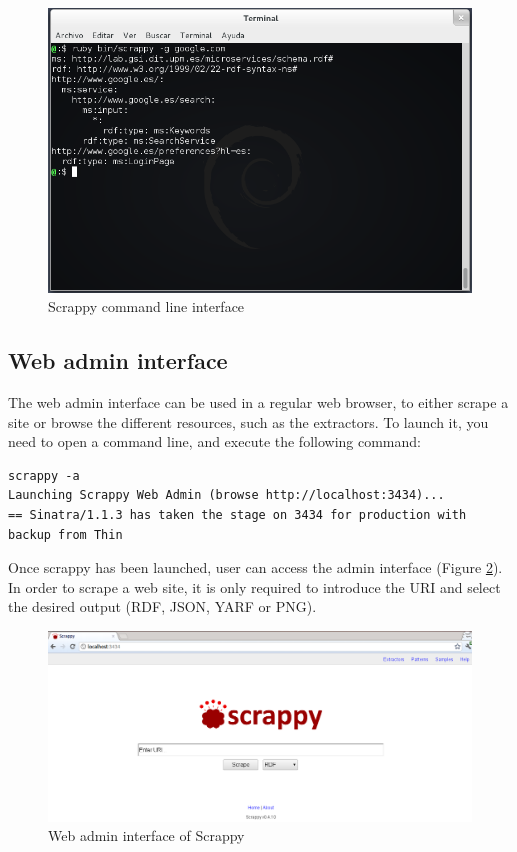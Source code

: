 \begin{figure}[h]
	\centering
	\includegraphics[width=400pt]{graphics/scrappy-cmd.png}
	\caption{Scrappy command line interface}
	\label{fig:scrappycmd}
\end{figure}

\subsection{Web admin interface}
The web admin interface can be used in a regular web browser, to either scrape a site or
browse the different resources, such as the extractors. To launch it, you need to open a
command line, and execute the following command:

\begin{lstlisting}[style=consola, numbers=none]
scrappy -a
Launching Scrappy Web Admin (browse http://localhost:3434)...
== Sinatra/1.1.3 has taken the stage on 3434 for production with backup from Thin
\end{lstlisting}

Once scrappy has been launched, user can access the admin interface (Figure \ref{fig:scrappyweb}). In order to
scrape a web site, it is only required to introduce the URI and select the desired output (RDF,
JSON, YARF or PNG).

\begin{figure}[h]
	\centering
	\includegraphics[width=400pt]{graphics/scrappy-web.png}
	\caption{Web admin interface of Scrappy}
	\label{fig:scrappyweb}
\end{figure}

